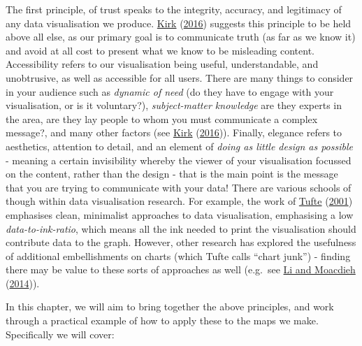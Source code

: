 \documentclass[
]{book}
\begin{document}
The first principle, of trust speaks to the integrity, accuracy, and legitimacy of any data visualisation we produce. \protect\hyperlink{ref-Kirk_2016}{Kirk} (\protect\hyperlink{ref-Kirk_2016}{2016}) suggests this principle to be held above all else, as our primary goal is to communicate truth (as far as we know it) and avoid at all cost to present what we know to be misleading content. Accessibility refers to our visualisation being useful, understandable, and unobtrusive, as well as accessible for all users. There are many things to consider in your audience such as \emph{dynamic of need} (do they have to engage with your visualisation, or is it voluntary?), \emph{subject-matter knowledge} are they experts in the area, are they lay people to whom you must communicate a complex message?, and many other factors (see \protect\hyperlink{ref-Kirk_2016}{Kirk} (\protect\hyperlink{ref-Kirk_2016}{2016})). Finally, elegance refers to aesthetics, attention to detail, and an element of \emph{doing as little design as possible} - meaning a certain invisibility whereby the viewer of your visualisation focussed on the content, rather than the design - that is the main point is the message that you are trying to communicate with your data! There are various schools of though within data visualisation research. For example, the work of \protect\hyperlink{ref-Tufte_2001}{Tufte} (\protect\hyperlink{ref-Tufte_2001}{2001}) emphasises clean, minimalist approaches to data visualisation, emphasising a low \emph{data-to-ink-ratio}, which means all the ink needed to print the visualisation should contribute data to the graph. However, other research has explored the usefulness of additional embellishments on charts (which Tufte calls ``chart junk'') - finding there may be value to these sorts of approaches as well (e.g.~see \protect\hyperlink{ref-Li_2014}{Li and Moacdieh} (\protect\hyperlink{ref-Li_2014}{2014})).

In this chapter, we will aim to bring together the above principles, and work through a practical example of how to apply these to the maps we make. Specifically we will cover:
\end{document}

